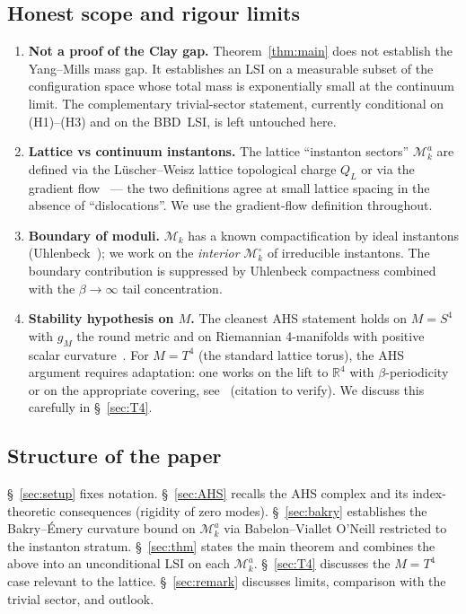 \documentclass[11pt,a4paper]{amsart}
\theoremstyle{definition}
\newcommand{\R}{\mathbb{R}}
\newcommand{\Mmod}{\mathcal{M}}
\begin{document}
\subsection{Honest scope and rigour limits}
\label{sec:scope}
\begin{enumerate}[label=(\alph*),leftmargin=2em]
\item \textbf{Not a proof of the Clay gap.} Theorem~\ref{thm:main} does
not establish the Yang--Mills mass gap. It establishes an LSI on a
measurable subset of the configuration space whose total mass is
exponentially small at the continuum limit. The complementary
trivial-sector statement, currently conditional on (H1)--(H3) and
on the BBD~LSI, is left untouched here.
\item \textbf{Lattice vs continuum instantons.} The lattice
``instanton sectors'' $\Mmod_k^a$ are defined via the
L\"uscher--Weisz lattice topological charge $Q_L$ or via the gradient
flow~\cite{Luscher2010WilsonFlow,Luscher2009TrivializingMaps} ---
the two definitions agree at small lattice spacing in the absence of
``dislocations''. We use the gradient-flow definition throughout.
\item \textbf{Boundary of moduli.} $\Mmod_k$ has a known compactification
by ideal instantons (Uhlenbeck~\cite{Uhlenbeck1982}); we work on the
\emph{interior} $\Mmod_k^\circ$ of irreducible instantons. The boundary
contribution is suppressed by Uhlenbeck compactness combined with the
$\beta\to\infty$ tail concentration.
\item \textbf{Stability hypothesis on $M$.} The cleanest AHS statement
holds on $M=S^4$ with $g_M$ the round metric and on Riemannian 4-manifolds
with positive scalar curvature~\cite[Thm.~3.3]{AtiyahHitchinSinger1978}.
For $M = T^4$ (the standard lattice torus), the AHS argument requires
adaptation: one works on the lift to $\R^4$ with $\beta$-periodicity or
on the appropriate covering, see~\cite{vanBaal1996} (citation to verify).
We discuss this carefully in \S~\ref{sec:T4}.
\end{enumerate}

\subsection{Structure of the paper}
\S~\ref{sec:setup} fixes notation. \S~\ref{sec:AHS} recalls the
AHS complex and its index-theoretic consequences (rigidity of zero
modes). \S~\ref{sec:bakry} establishes the Bakry--\'Emery curvature
bound on $\Mmod_k^a$ via Babelon--Viallet O'Neill restricted to the
instanton stratum. \S~\ref{sec:thm} states the main theorem and
combines the above into an unconditional LSI on each $\Mmod_k^a$.
\S~\ref{sec:T4} discusses the $M=T^4$ case relevant to the lattice.
\S~\ref{sec:remark} discusses limits, comparison with the trivial
sector, and outlook.
\end{document}
